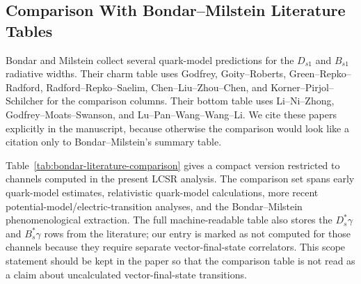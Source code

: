 \documentclass[11pt]{article}
\begin{document}
\subsection{Comparison With Bondar--Milstein Literature Tables}

Bondar and Milstein collect several quark-model predictions for the
$D_{s1}$ and $B_{s1}$ radiative widths.  Their charm table uses Godfrey,
Goity--Roberts, Green--Repko--Radford, Radford--Repko--Saelim,
Chen--Liu--Zhou--Chen, and Korner--Pirjol--Schilcher for the comparison
columns.  Their bottom table uses Li--Ni--Zhong, Godfrey--Moats--Swanson, and
Lu--Pan--Wang--Wang--Li.  We cite these papers explicitly in the manuscript,
because otherwise the comparison would look like a citation only to
Bondar--Milstein's summary table.

Table~\ref{tab:bondar-literature-comparison} gives a compact version restricted
to channels computed in the present LCSR analysis.  The comparison set spans
early quark-model estimates, relativistic quark-model calculations, more recent
potential-model/electric-transition analyses, and the Bondar--Milstein
phenomenological extraction.  The full machine-readable table also stores the
$D_s^*\gamma$ and $B_s^*\gamma$ rows from the literature; our entry is marked
as not computed for those channels because they require separate
vector-final-state correlators.  This scope statement should be kept in the
paper so that the comparison table is not read as a claim about uncalculated
vector-final-state transitions.
\end{document}
